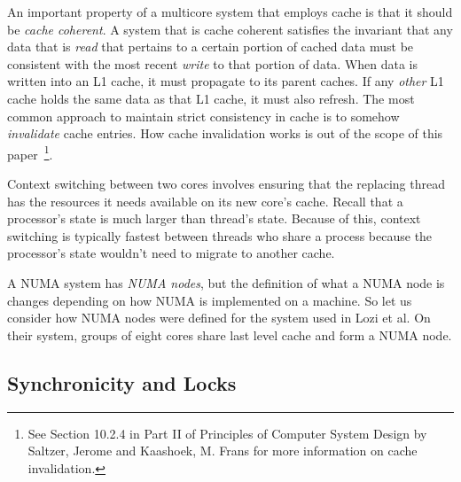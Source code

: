 \documentclass{sig-alternate}
\begin{document}


An important property of a multicore system that employs cache is that it should be \emph{cache coherent}. A system that is cache coherent satisfies the invariant that any data that is \emph{read} that pertains to a certain portion of cached data must be consistent with the most recent \emph{write} to that portion of data. When data is written into an L1 cache, it must propagate to its parent caches. If any \emph{other} L1 cache holds the same data as that L1 cache, it must also refresh. The most common approach to maintain strict consistency in cache is to somehow \emph{invalidate} cache entries. How cache invalidation works is out of the scope of this paper~\footnote{See Section 10.2.4 in Part II of Principles of Computer System Design by Saltzer, Jerome and Kaashoek, M. Frans for more information on cache invalidation.}.~\cite{Systems}

Context switching between two cores involves ensuring that the replacing thread has the resources it needs available on its new core's cache. Recall that a processor's state is much larger than thread's state. Because of this, context switching is typically fastest between threads who share a process because the processor's state wouldn't need to migrate to another cache.

A NUMA system has \emph{NUMA nodes}, but the definition of what a NUMA node is changes depending on how NUMA is implemented on a machine. So let us consider how NUMA nodes were defined for the system used in Lozi et al. On their system, groups of eight cores share last level cache and form a NUMA node.

\subsection{Synchronicity and Locks}
\label{sec:locks}
\end{document}

